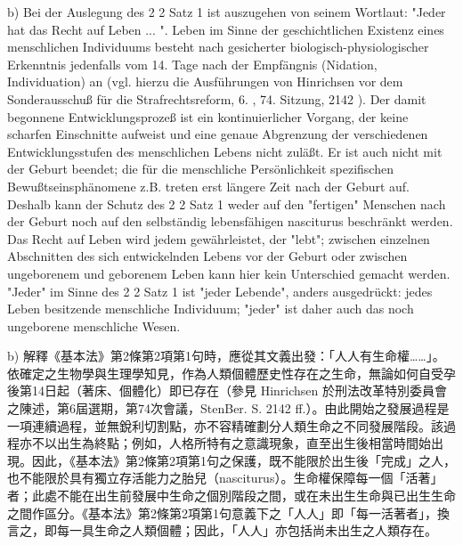 \documentclass[12pt]{article}
\begin{document}
\syncleft
\begin{sourcepara}
b) Bei der Auslegung des \abbrArt{} 2 \abbrAbs{} 2 Satz 1 \abbrGG{}\ggfnArtTwoTwoOneDE{} ist auszugehen von seinem Wortlaut: "Jeder hat das Recht auf Leben ... ". Leben im Sinne der geschichtlichen Existenz eines menschlichen Individuums besteht nach gesicherter biologisch-physiologischer Erkenntnis jedenfalls vom 14. Tage nach der Empfängnis (Nidation, Individuation) an (vgl. hierzu die Ausführungen von Hinrichsen vor dem Sonderausschuß für die Strafrechtsreform, 6. \abbrWp{}, 74. Sitzung, \abbrStenBer{} \abbrS{} 2142 \abbrFF{}). Der damit begonnene Entwicklungsprozeß ist ein kontinuierlicher Vorgang, der keine scharfen Einschnitte aufweist und eine genaue Abgrenzung der verschiedenen Entwicklungsstufen des menschlichen Lebens nicht zuläßt. Er ist auch nicht mit der Geburt beendet; die für die menschliche Persönlichkeit spezifischen Bewußtseinsphänomene z.B. treten erst längere Zeit nach der Geburt auf. Deshalb kann der Schutz des \abbrArt{} 2 \abbrAbs{} 2 Satz 1 \abbrGG{}\ggfnArtTwoTwoOneDE{} weder auf den "fertigen" Menschen nach der Geburt noch auf den selbständig lebensfähigen nasciturus beschränkt werden. Das Recht auf Leben wird jedem gewährleistet, der "lebt"; zwischen einzelnen Abschnitten des sich entwickelnden Lebens vor der Geburt oder zwischen ungeborenem und geborenem Leben kann hier kein Unterschied gemacht werden. "Jeder" im Sinne des \abbrArt{} 2 \abbrAbs{} 2 Satz 1 \abbrGG{}\ggfnArtTwoTwoOneDE{} ist "jeder Lebende", anders ausgedrückt: jedes Leben besitzende menschliche Individuum; "jeder" ist daher auch das noch ungeborene menschliche Wesen.
\end{sourcepara}
\begin{transpara}
b) 解釋《基本法》第2條第2項第1句\ggfnArtTwoTwoOneZH{}時，應從其文義出發：「人人有生命權……」。依確定之生物學與生理學知見，作為人類個體歷史性存在之生命，無論如何自受孕後第14日起（著床、個體化）即已存在（參見 Hinrichsen 於刑法改革特別委員會之陳述，第6屆選期，第74次會議，StenBer. S. 2142 ff.）。由此開始之發展過程是一項連續過程，並無銳利切割點，亦不容精確劃分人類生命之不同發展階段。該過程亦不以出生為終點；例如，人格所特有之意識現象，直至出生後相當時間始出現。因此，《基本法》第2條第2項第1句\ggfnArtTwoTwoOneZH{}之保護，既不能限於出生後「完成」之人，也不能限於具有獨立存活能力之胎兒（nasciturus）。生命權保障每一個「活著」者；此處不能在出生前發展中生命之個別階段之間，或在未出生生命與已出生生命之間作區分。《基本法》第2條第2項第1句\ggfnArtTwoTwoOneZH{}意義下之「人人」即「每一活著者」，換言之，即每一具生命之人類個體；因此，「人人」亦包括尚未出生之人類存在。
\end{transpara}
\end{document}
